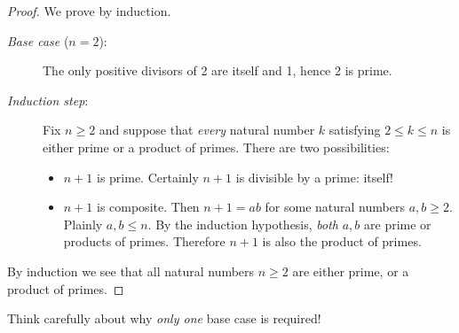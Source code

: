 \begin{proof}
	We prove by induction.
	\begin{description}
		\item[\normalfont\emph{Base case} ($n=2$):] The only positive divisors of 2 are itself and 1, hence 2 is prime.
		\item[\normalfont\emph{Induction step}:] Fix $n\ge 2$ and suppose that \emph{every} natural number $k$ satisfying $2\le k\le n$ is either prime or a product of primes. There are two possibilities:
		\begin{itemize}
		  \item $n+1$ is prime. Certainly $n+1$ is divisible by a prime: itself!
		  \item $n+1$ is composite. Then $n+1=ab$ for some natural numbers $a,b\ge 2$. Plainly $a,b\le n$. By the induction hypothesis, \emph{both} $a,b$ are prime or products of primes. Therefore $n+1$ is also the product of primes.
		\end{itemize}
	\end{description}
	By induction we see that all natural numbers $n\ge 2$ are either prime, or a product of primes.
\end{proof}

Think carefully about why \emph{only one} base case is required!



